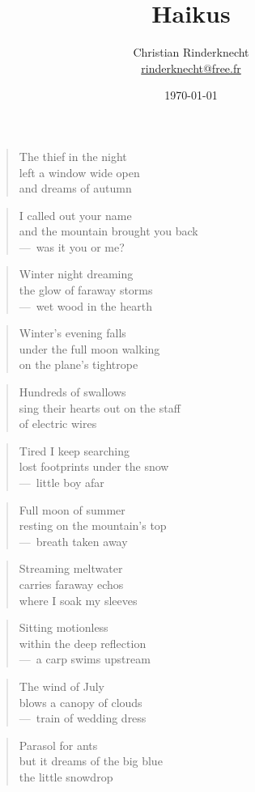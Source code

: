 \documentclass[a4paper,12pt]{article}
\title{Haikus}
\author{Christian Rinderknecht\\
{\small \url{rinderknecht@free.fr}}}
\date{\today}
\begin{document}
\begin{verse}
  The thief in the night \\
  left a window wide open \\
  and dreams of autumn
\end{verse}

\begin{verse}
  I called out your name \\
  and the mountain brought you back \\
  ---~was it you or me?
\end{verse}

\begin{verse}
  Winter night dreaming \\
  the glow of faraway storms \\
  ---~wet wood in the hearth
\end{verse}

\begin{verse}
  Winter's evening falls \\
  under the full moon walking \\
  on the plane's tightrope
\end{verse}

\begin{verse}
  Hundreds of swallows \\
  sing their hearts out on the staff \\
  of electric wires
\end{verse}

\begin{verse}
  Tired I keep searching \\
  lost footprints under the snow \\
  ---~little boy afar
\end{verse}

\begin{verse}
  Full moon of summer \\
  resting on the mountain's top \\
  ---~breath taken away
\end{verse}

\begin{verse}
  Streaming meltwater \\
  carries faraway echos \\
  where I soak my sleeves
\end{verse}

\begin{verse}
  Sitting motionless \\
  within the deep reflection \\
  ---~a carp swims upstream
\end{verse}

\begin{verse}
  The wind of July \\
  blows a canopy of clouds \\
  ---~train of wedding dress
\end{verse}

\begin{verse}
  Parasol for ants \\
  but it dreams of the big blue \\
  the little snowdrop
\end{verse}
\end{document}
